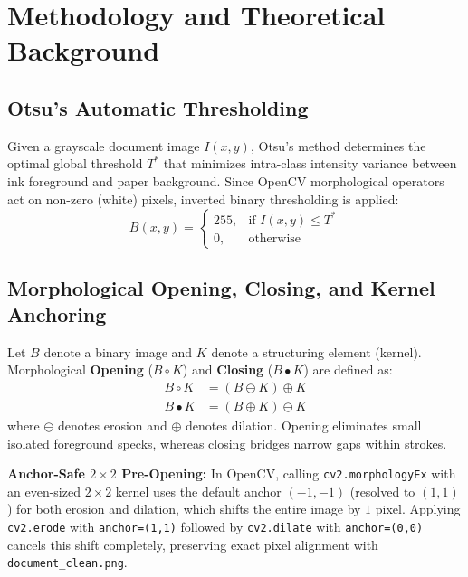 \documentclass[12pt]{article}
\begin{document}
\section{Methodology and Theoretical Background}

\subsection{Otsu's Automatic Thresholding}
Given a grayscale document image $I(x, y)$, Otsu's method determines the optimal global threshold $T^*$ that minimizes intra-class intensity variance between ink foreground and paper background. Since OpenCV morphological operators act on non-zero (white) pixels, inverted binary thresholding is applied:
\begin{equation}
    B(x, y) = 
    \begin{cases} 
        255, & \text{if } I(x, y) \le T^* \\
        0, & \text{otherwise}
    \end{cases}
\end{equation}

\subsection{Morphological Opening, Closing, and Kernel Anchoring}
Let $B$ denote a binary image and $K$ denote a structuring element (kernel). Morphological \textbf{Opening} ($B \circ K$) and \textbf{Closing} ($B \bullet K$) are defined as:
\begin{align}
    B \circ K &= (B \ominus K) \oplus K \\
    B \bullet K &= (B \oplus K) \ominus K
\end{align}
where $\ominus$ denotes erosion and $\oplus$ denotes dilation. Opening eliminates small isolated foreground specks, whereas closing bridges narrow gaps within strokes.

\textbf{Anchor-Safe $2 \times 2$ Pre-Opening:} In OpenCV, calling \texttt{cv2.morphologyEx} with an even-sized $2 \times 2$ kernel uses the default anchor $(-1,-1)$ (resolved to $(1,1)$) for both erosion and dilation, which shifts the entire image by $1$ pixel. Applying \texttt{cv2.erode} with \texttt{anchor=(1,1)} followed by \texttt{cv2.dilate} with \texttt{anchor=(0,0)} cancels this shift completely, preserving exact pixel alignment with \texttt{document\_clean.png}.
\end{document}
